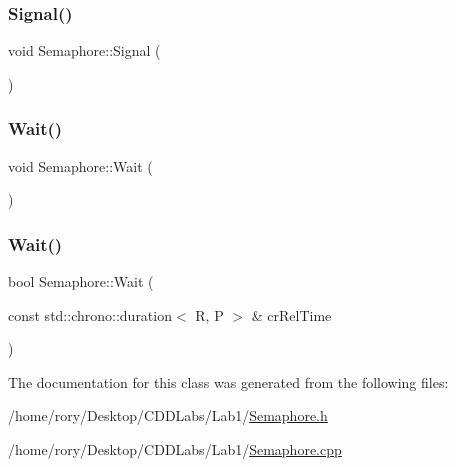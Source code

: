 \subsubsection{\texorpdfstring{Signal()}{Signal()}}
{\footnotesize\ttfamily void Semaphore\+::\+Signal (\begin{DoxyParamCaption}{ }\end{DoxyParamCaption})}

\mbox{\label{class_semaphore_a72aabebf026e3a8b1f3e4d0fa8ee1eda}} 
\subsubsection{\texorpdfstring{Wait()}{Wait()}\hspace{0.1cm}{\footnotesize\ttfamily [1/2]}}
{\footnotesize\ttfamily void Semaphore\+::\+Wait (\begin{DoxyParamCaption}{ }\end{DoxyParamCaption})}

\mbox{\label{class_semaphore_a4633191100ac04557620cbb4714b4865}} 
\subsubsection{\texorpdfstring{Wait()}{Wait()}\hspace{0.1cm}{\footnotesize\ttfamily [2/2]}}
{\footnotesize\ttfamily bool Semaphore\+::\+Wait (\begin{DoxyParamCaption}\item[{const std\+::chrono\+::duration$<$ R, P $>$ \&}]{cr\+Rel\+Time }\end{DoxyParamCaption})}



The documentation for this class was generated from the following files\+:\begin{DoxyCompactItemize}
\item 
/home/rory/\+Desktop/\+C\+D\+D\+Labs/\+Lab1/\hyperlink{_semaphore_8h}{Semaphore.\+h}\item 
/home/rory/\+Desktop/\+C\+D\+D\+Labs/\+Lab1/\hyperlink{_semaphore_8cpp}{Semaphore.\+cpp}\end{DoxyCompactItemize}
